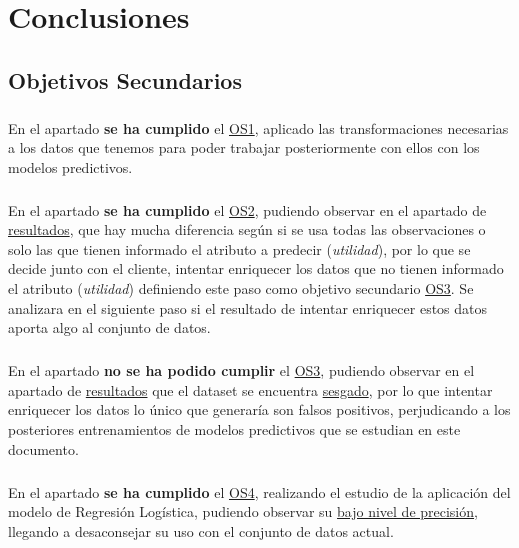 \chapter{Conclusiones}
\label{chapter:conclusiones}

\section{Objetivos Secundarios}

\paragraph{}
En el apartado  \textbf{se ha cumplido} el \hyperref[os:OS1]{OS1}, aplicado las transformaciones necesarias a los datos que tenemos para poder trabajar posteriormente con ellos con los modelos predictivos.

\paragraph{}
En el apartado  \textbf{se ha cumplido} el \hyperref[os:OS2]{OS2}, pudiendo observar en el apartado de \hyperref[resultados:pca]{resultados}, que hay mucha diferencia según si se usa todas las observaciones o solo las que tienen informado el atributo a predecir (\textit{utilidad}), por lo que se decide junto con el cliente, intentar enriquecer los datos que no tienen informado el atributo (\textit{utilidad}) definiendo este paso como objetivo secundario \hyperref[os:OS3]{OS3}. Se analizara en el siguiente paso si el resultado de intentar enriquecer estos datos aporta algo al conjunto de datos.

\paragraph{}
En el apartado  \textbf{no se ha podido cumplir} el \hyperref[os:OS3]{OS3}, pudiendo observar en el apartado de \hyperref[resultados:knn_conclusiones]{resultados} que el dataset se encuentra \hyperref[resultados:knn]{sesgado}, por lo que intentar enriquecer los datos lo único que generaría son falsos positivos, perjudicando a los posteriores entrenamientos de modelos predictivos que se estudian en este documento.

\paragraph{}
En el apartado  \textbf{se ha cumplido} el \hyperref[os:OS4]{OS4}, realizando el estudio de la aplicación del modelo de Regresión Logística, pudiendo observar su \hyperref[resultados:lr]{bajo nivel de precisión}, llegando a desaconsejar su uso con el conjunto de datos actual.

